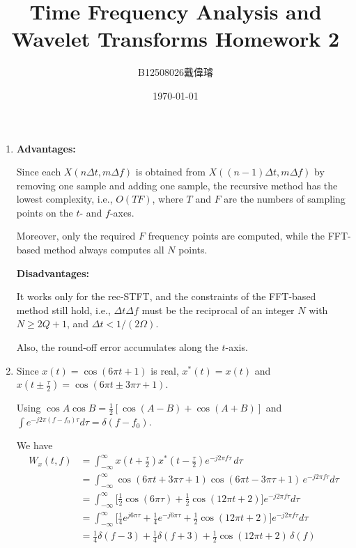 \documentclass[12pt,a4paper]{article}
\title{Time Frequency Analysis and Wavelet Transforms Homework 2}
\author{B12508026戴偉璿}
\date{\today}
\begin{document}
\maketitle


\begin{enumerate}

\item
\textbf{Advantages:} 

Since each $X(n\Delta t,m\Delta f)$ is obtained from $X((n-1)\Delta t,m\Delta f)$ by removing one sample and adding one sample, the recursive method has the lowest complexity, i.e., $O(TF)$, where $T$ and $F$ are the numbers of sampling points on the $t$- and $f$-axes.  

Moreover, only the required $F$ frequency points are computed, while the FFT-based method always computes all $N$ points.

\textbf{Disadvantages:} 

It works only for the rec-STFT, and the constraints of the FFT-based method still hold, i.e., $\Delta t\Delta f$ must be the reciprocal of an integer $N$ with $N\ge 2Q+1$, and $\Delta t<1/(2\Omega)$.

Also, the round-off error accumulates along the $t$-axis.

\item Since $x(t)=\cos(6\pi t+1)$ is real, $x^*(t)=x(t)$ and $x\!\left(t\pm\tfrac\tau2\right)=\cos(6\pi t\pm3\pi\tau+1)$. 

Using $\cos A\cos B=\frac12[\cos(A-B)+\cos(A+B)]$ and $\int e^{-j2\pi(f-f_0)\tau}d\tau=\delta(f-f_0)$.

We have
\begin{align*}
W_x(t,f)&=\int_{-\infty}^{\infty}x\!\left(t+\tfrac{\tau}{2}\right)x^*\!\left(t-\tfrac{\tau}{2}\right)e^{-j2\pi f\tau}\,d\tau\\
&=\int_{-\infty}^{\infty}\cos(6\pi t+3\pi\tau+1)\cos(6\pi t-3\pi\tau+1)\,e^{-j2\pi f\tau}d\tau\\
&=\int_{-\infty}^{\infty}\Big[\tfrac12\cos(6\pi\tau)+\tfrac12\cos(12\pi t+2)\Big]e^{-j2\pi f\tau}d\tau\\
&=\int_{-\infty}^{\infty}\Big[\tfrac14e^{j6\pi\tau}+\tfrac14e^{-j6\pi\tau}+\tfrac12\cos(12\pi t+2)\Big]e^{-j2\pi f\tau}d\tau\\
&=\tfrac14\delta(f-3)+\tfrac14\delta(f+3)+\tfrac12\cos(12\pi t+2)\,\delta(f)
\end{align*}


\end{enumerate}
\end{document}
